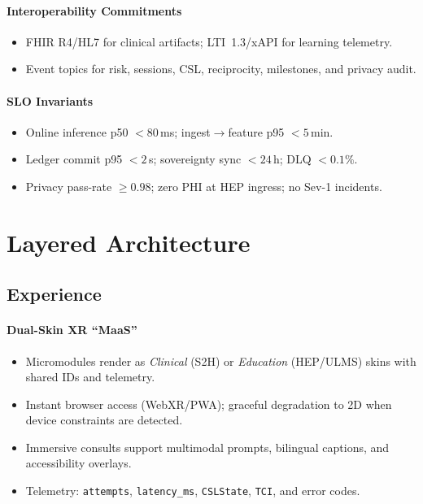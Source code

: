 \documentclass[11pt]{article}
\theoremstyle{plain}
\begin{document}
\paragraph{Interoperability Commitments}
\begin{itemize}
  \item FHIR R4/HL7 for clinical artifacts; LTI~1.3/xAPI for learning telemetry.
  \item Event topics for risk, sessions, CSL, reciprocity, milestones, and privacy audit.
\end{itemize}

\paragraph{SLO Invariants}
\begin{itemize}
  \item Online inference p50 $<80$\,ms; ingest$\rightarrow$feature p95 $<5$\,min.
  \item Ledger commit p95 $<2$\,s; sovereignty sync $<24$\,h; DLQ $<0.1\%$.
  \item Privacy pass-rate $\ge 0.98$; zero PHI at HEP ingress; no Sev-1 incidents.
\end{itemize}

\section{Layered Architecture}

\subsection{Experience}
\paragraph{Dual-Skin XR ``MaaS''}
\begin{itemize}
  \item Micromodules render as \emph{Clinical} (S2H) or \emph{Education} (HEP/ULMS) skins with shared IDs and telemetry.
  \item Instant browser access (WebXR/PWA); graceful degradation to 2D when device constraints are detected.
  \item Immersive consults support multimodal prompts, bilingual captions, and accessibility overlays.
  \item Telemetry: \texttt{attempts}, \texttt{latency\_ms}, \texttt{CSLState}, \texttt{TCI}, and error codes.
\end{itemize}
\end{document}
